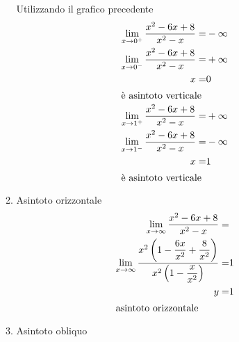 \begin{exercise}
\begin{itemize}
\begin{enumerate}
		Utilizzando il grafico precedente
		\begin{align*}
		\lim_{x\to 0^+}\dfrac{x^2-6x+8}{x^2-x}=&-\infty\\
		\lim_{x\to 0^-}\dfrac{x^2-6x+8}{x^2-x}=&+\infty\\
		x=&0\\
		\intertext{è asintoto verticale}
		\lim_{x\to 1^+}\dfrac{x^2-6x+8}{x^2-x}=&+\infty\\
		\lim_{x\to 1^-}\dfrac{x^2-6x+8}{x^2-x}=&-\infty\\
		x=&1\\
		\intertext{è asintoto verticale}
		\end{align*}
	\item Asintoto orizzontale 
		\begin{align*}
	\lim_{x\to \infty}\dfrac{x^2-6x+8}{x^2-x}=&\\
	\lim_{x\to \infty}\dfrac{x^2\left(1-\dfrac{6x}{x^2}+\dfrac{8}{x^2}\right)}{x^2\left(1-\dfrac{x}{x^2}\right)}=&1\\
	y=&1\\
	\intertext{asintoto orizzontale}
		\end{align*}
		\item Asintoto obliquo
		

\end{enumerate}
\end{itemize}
\end{exercise}
